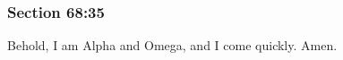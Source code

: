 	\subsubsection{Section 68:35} %
		\label{DC68-35}

		Behold, I am Alpha and Omega, and I come quickly.  Amen.


